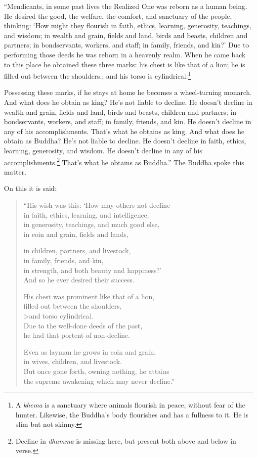 \documentclass[12pt,openany]{book}%
\begin{document}
“Mendicants, in some past lives the Realized One was reborn as a human being. He desired the good, the welfare, the comfort, and sanctuary of the people, thinking: ‘How might they flourish in faith, ethics, learning, generosity, teachings, and wisdom; in wealth and grain, fields and land, birds and beasts, children and partners; in bondservants, workers, and staff; in family, friends, and kin?’ Due to performing those deeds he was reborn in a heavenly realm. When he came back to this place he obtained these three marks: his chest is like that of a lion; he is filled out between the shoulders.; and his torso is cylindrical.\footnote{A \textit{khema} is a sanctuary where animals flourish in peace, without fear of the hunter. Likewise, the Buddha’s body flourishes and has a fullness to it. He is slim but not skinny. } 

Possessing these marks, if he stays at home he becomes a wheel-turning monarch. And what does he obtain as king? He’s not liable to decline. He doesn’t decline in wealth and grain, fields and land, birds and beasts, children and partners; in bondservants, workers, and staff; in family, friends, and kin. He doesn’t decline in any of his accomplishments. That’s what he obtains as king. And what does he obtain as Buddha? He’s not liable to decline. He doesn’t decline in faith, ethics, learning, generosity, and wisdom. He doesn’t decline in any of his accomplishments.\footnote{Decline in \textit{dhamma} is missing here, but present both above and below in verse. } That’s what he obtains as Buddha.” The Buddha spoke this matter. 

On this it is said: 

\begin{verse}%
“His wish was this: ‘How may others not decline \\
in faith, ethics, learning, and intelligence, \\
in generosity, teachings, and much good else, \\
in coin and grain, fields and lands, 

in children, partners, and livestock, \\
in family, friends, and kin, \\
in strength, and both beauty and happiness?’ \\
And so he ever desired their success. 

His chest was prominent like that of a lion, \\
filled out between the shoulders, \\>and torso cylindrical. \\
Due to the well-done deeds of the past, \\
he had that portent of non-decline. 

Even as layman he grows in coin and grain, \\
in wives, children, and livestock. \\
But once gone forth, owning nothing, he attains \\
the supreme awakening which may never decline.” 

%
\end{verse}
\end{document}
